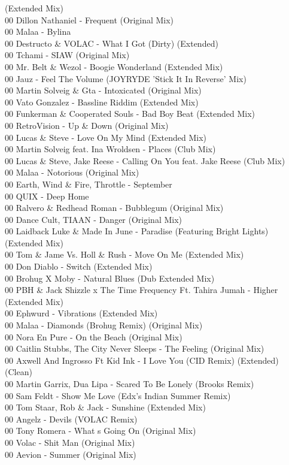 \begin{multicols}{2}
(Extended Mix)\\ 00 Dillon Nathaniel - Frequent (Original Mix)\\ 00 Malaa - Bylina\\ 00 Destructo \& VOLAC - What I Got (Dirty) (Extended)\\ 00 Tchami - SIAW (Original Mix)\\ 00 Mr. Belt \& Wezol - Boogie Wonderland (Extended Mix)\\ 00 Jauz - Feel The Volume (JOYRYDE 'Stick It In Reverse' Mix)\\ 00 Martin Solveig \& Gta - Intoxicated (Original Mix)\\ 00 Vato Gonzalez - Bassline Riddim (Extended Mix)\\ 00 Funkerman \& Cooperated Souls - Bad Boy Beat (Extended Mix)\\ 00 RetroVision -  Up \& Down (Original Mix)\\ 00 Lucas \& Steve - Love On My Mind (Extended Mix)\\ 00 Martin Solveig feat. Ina Wroldsen - Places (Club Mix)\\ 00 Lucas \& Steve, Jake Reese - Calling On You feat. Jake Reese (Club Mix)\\ 00 Malaa - Notorious (Original Mix)\\ 00 Earth, Wind \& Fire, Throttle - September\\ 00 QUIX - Deep Home\\ 00 Ralvero \& Redhead Roman - Bubblegum (Original Mix)\\ 00 Dance Cult, TIAAN - Danger (Original Mix)\\ 00 Laidback Luke \& Made In June - Paradise (Featuring Bright Lights) (Extended Mix)\\ 00 Tom \& Jame Vs. Holl \& Rush - Move On Me (Extended Mix)\\ 00 Don Diablo - Switch (Extended Mix)\\ 00 Brohug X Moby - Natural Blues (Dub Extended Mix)\\ 00 PBH \& Jack Shizzle x The Time Frequency Ft. Tahira Jumah  -  Higher (Extended Mix)\\ 00 Ephwurd - Vibrations (Extended Mix)\\ 00 Malaa - Diamonds (Brohug Remix) (Original Mix)\\ 00 Nora En Pure - On the Beach (Original Mix)\\ 00 Caitlin Stubbs, The City Never Sleeps - The Feeling (Original Mix)\\ 00 Axwell And Ingrosso Ft Kid Ink - I Love You (CID Remix) (Extended) (Clean)\\ 00 Martin Garrix, Dua Lipa - Scared To Be Lonely (Brooks Remix)\\ 00 Sam Feldt - Show Me Love (Edx's Indian Summer Remix)\\ 00 Tom Staar, Rob \& Jack - Sunshine (Extended Mix)\\ 00 Angelz - Devils (VOLAC Remix)\\ 00 Tony Romera - What s Going On (Original Mix)\\ 00 Volac - Shit Man (Original Mix)\\ 00 Aevion - Summer (Original Mix) \\

\end{multicols}
